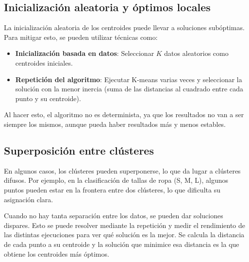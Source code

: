 \subsection{Inicialización aleatoria y óptimos locales}
La inicialización aleatoria de los centroides puede llevar a soluciones subóptimas. Para mitigar esto, se pueden utilizar técnicas como:
\begin{itemize}
\item \textbf{Inicialización basada en datos}: Seleccionar $K$ datos aleatorios como centroides iniciales.
\item \textbf{Repetición del algoritmo}: Ejecutar K-means varias veces y seleccionar la solución con la menor inercia (suma de las distancias al cuadrado entre cada punto y su centroide).
\end{itemize}

Al hacer esto, el algoritmo no es determinista, ya que los resultados no van a ser siempre los mismos, aunque pueda haber resultados más y menos estables. 

\subsection{Superposición entre clústeres}
En algunos casos, los clústeres pueden superponerse, lo que da lugar a clústeres difusos. Por ejemplo, en la clasificación de tallas de ropa (S, M, L), algunos puntos pueden estar en la frontera entre dos clústeres, lo que dificulta su asignación clara.

Cuando no hay tanta separación entre los datos, se pueden dar soluciones dispares. Esto se puede resolver mediante la repetición y medir el rendimiento de las distintas ejecuciones para ver qué solución es la mejor. Se calcula la distancia de cada punto a su centroide y la solución que minimice esa distancia es la que obtiene los centroides más óptimos. 


